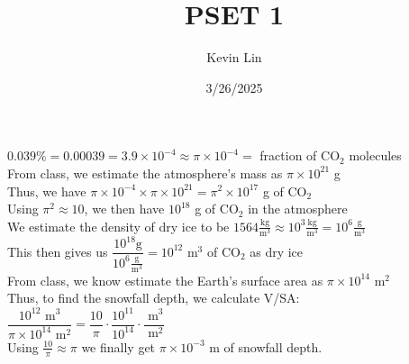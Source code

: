 \documentclass[11pt,a4paper,margin=1in]{article}
\title{PSET 1}
\author{Kevin Lin}
\date{3/26/2025}
\begin{document}
\maketitle
\section{}
\begin{flushleft}
    $0.039\% = 0.00039 = 3.9\times10^{-4} \approx \pi\times10^{-4} = $ fraction of
        $\text{CO}_2$ molecules\\
    From class, we estimate the atmosphere's mass as $\pi\times10^{21}$ g\\
    Thus, we have $\pi\times10^{-4} \times \pi\times10^{21} = \pi^2\times10^{17}$ g
        of $\text{CO}_2$\\
    Using $\pi^2 \approx 10$, we then have $10^{18}$ g of $\text{CO}_2$ in the
        atmosphere\\
    We estimate the density of dry ice to be $1564 \frac{\text{kg}}{\text{m}^3}
        \approx 10^3 \frac{\text{kg}}{\text{m}^3} = 10^6 \frac{\text{g}}{\text{m}^3}$\\
    This then gives us $\dfrac{10^{18} \text{g}}{10^6 \frac{\text{g}}{\text{m}^3}}
        = 10^{12} \text{ m}^3$ of $\text{CO}_2$ as dry ice\\
    From class, we know estimate the Earth's surface area as $\pi\times10^{14}\text{ m}^2$\\
    Thus, to find the snowfall depth, we calculate V/SA:\\
    $\dfrac{10^{12}\text{ m}^3}{\pi\times10^{14}\text{ m}^2} = \dfrac{10}{\pi}\cdot
        \dfrac{10^{11}}{10^{14}}\cdot\dfrac{\text{ m}^3}{\text{ m}^2}$\\
    Using $\frac{10}{\pi} \approx \pi$ we finally get $\pi\times10^{-3}\text{ m}$
        of snowfall depth.
\end{flushleft}
\end{document}
